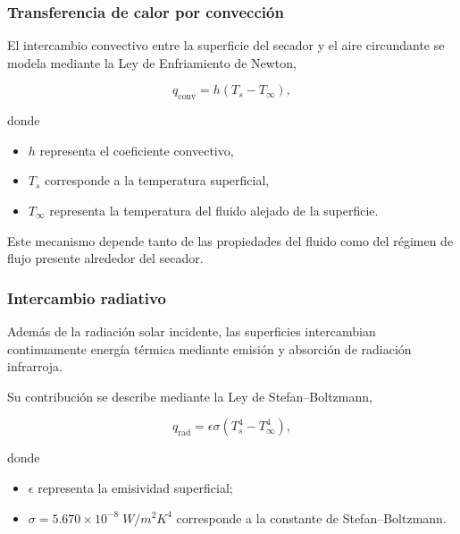 \subsubsection{Transferencia de calor por convección}

El intercambio convectivo entre la superficie del secador y el aire circundante se modela mediante la Ley de Enfriamiento de Newton,

\begin{equation}
q_{\mathrm{conv}}
=
h
(T_s-T_\infty),
\label{eq:qconv}
\end{equation}

donde

\begin{itemize}

\item $h$ representa el coeficiente convectivo,

\item $T_s$ corresponde a la temperatura superficial,

\item $T_\infty$ representa la temperatura del fluido alejado de la superficie.

\end{itemize}

Este mecanismo depende tanto de las propiedades del fluido como del régimen de flujo presente alrededor del secador.

\subsubsection{Intercambio radiativo}

Además de la radiación solar incidente, las superficies intercambian continuamente energía térmica mediante emisión y absorción de radiación infrarroja.

Su contribución se describe mediante la Ley de Stefan--Boltzmann,

\begin{equation}
q_{\mathrm{rad}}
=
\epsilon\sigma
(T_s^4-T_\infty^4),
\label{eq:qrad}
\end{equation}

donde

\begin{itemize}

\item $\epsilon$ representa la emisividad superficial;

\item $\sigma=5.670\times10^{-8}\;W/m^2K^4$ corresponde a la constante de Stefan--Boltzmann.

\end{itemize}

